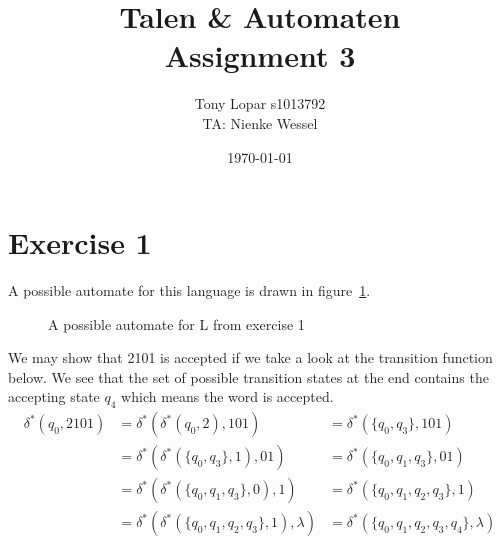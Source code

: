 \documentclass{article}
\begin{document}
\title{Talen \& Automaten \\ Assignment 3}
\date{\today}
\author{Tony Lopar \enspace s1013792 \\TA: Nienke Wessel}
\maketitle

\section*{Exercise 1}
A possible automate for this language is drawn in figure~\ref{Fig:M1}.
\begin{figure}[h]
\begin{center}
\end{center}
  \caption{A possible automate for L from exercise 1} \label{Fig:M1}
\end{figure}

We may show that 2101 is accepted if we take a look at the transition function below. We see that the set of possible transition states at the end contains the accepting state $q_4$ which means the word is accepted.
\begin{align*}
  \delta^* (q_0, 2101)  &= \delta^* (\delta^*(q_0, 2), 101) &= \delta^* (\{q_0, q_3 \}, 101) \\
                        &= \delta^* (\delta^*(\{q_0, q_3 \}, 1), 01) &= \delta^* (\{q_0, q_1, q_3 \}, 01) \\
                        &= \delta^* (\delta^*(\{q_0, q_1, q_3 \}, 0), 1) &= \delta^* (\{q_0, q_1, q_2, q_3 \}, 1) \\
                        &= \delta^* (\delta^*(\{q_0, q_1, q_2, q_3 \}, 1), \lambda) &= \delta^* (\{q_0, q_1, q_2, q_3, q_4 \}, \lambda) \\
\end{align*}
\end{document}
